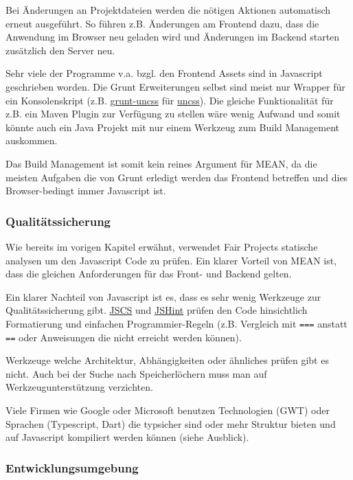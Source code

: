 Bei Änderungen an Projektdateien werden die nötigen Aktionen automatisch
erneut ausgeführt. So führen z.B. Änderungen am Frontend dazu, dass die
Anwendung im Browser neu geladen wird und Änderungen im Backend starten
zusätzlich den Server neu.

Sehr viele der Programme v.a. bzgl. den Frontend Assets sind in
Javascript geschrieben worden. Die Grunt Erweiterungen selbst sind meist
nur Wrapper für ein Konsolenskript (z.B.
\href{https://github.com/addyosmani/grunt-uncss}{grunt-uncss} für
\href{https://github.com/giakki/uncss}{uncss}). Die gleiche
Funktionalität für z.B. ein Maven Plugin zur Verfügung zu stellen wäre
wenig Aufwand und somit könnte auch ein Java Projekt mit nur einem
Werkzeug zum Build Management auskommen.

Das Build Management ist somit kein reines Argument für MEAN, da die
meisten Aufgaben die von Grunt erledigt werden das Frontend betreffen
und dies Browser-bedingt immer Javascript ist.

\subsubsection{Qualitätssicherung}\label{qualituxe4tssicherung}

Wie bereits im vorigen Kapitel erwähnt, verwendet Fair Projects
statische analysen um den Javascript Code zu prüfen. Ein klarer Vorteil
von MEAN ist, dass die gleichen Anforderungen für das Front- und Backend
gelten.

Ein klarer Nachteil von Javascript ist es, dass es sehr wenig Werkzeuge
zur Qualitätssicherung gibt. \href{http://jscs.info/}{JSCS} und
\href{http://jshint.com/}{JSHint} prüfen den Code hinsichtlich
Formatierung und einfachen Programmier-Regeln (z.B. Vergleich mit
\texttt{===} anstatt \texttt{==} oder Anweisungen die nicht erreicht
werden können).

Werkzeuge welche Architektur, Abhängigkeiten oder ähnliches prüfen gibt
es nicht. Auch bei der Suche nach Speicherlöchern muss man auf
Werkzeugunterstützung verzichten.

Viele Firmen wie Google oder Microsoft benutzen Technologien (GWT) oder
Sprachen (Typescript, Dart) die typsicher sind oder mehr Struktur bieten
und auf Javascript kompiliert werden können (siehe Ausblick).

\subsubsection{Entwicklungsumgebung}\label{entwicklungsumgebung}

